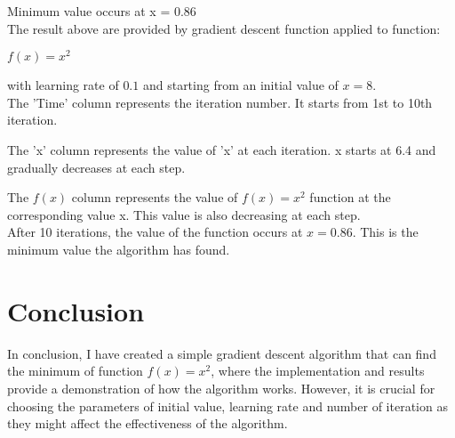 \documentclass{article}
\begin{document}
Minimum value occurs at x = 0.86\\

The result above are provided by gradient descent function applied to function:
\begin{center}
    $f(x) = x^2$
\end{center}
with learning rate of $0.1$ and starting from an initial value of $x = 8$.\\

The 'Time' column represents the iteration number. It starts from 1st to 10th iteration.

The 'x' column represents the value of 'x' at each iteration. x starts at 6.4 and gradually decreases at each step.

The $f(x)$ column represents the value of $f(x)=x^2$ function at the corresponding value x. This value is also decreasing at each step.\\

After 10 iterations, the value of the function occurs at $x = 0.86$. This is the minimum value the algorithm has found.

\section{Conclusion}

In conclusion, I have created a simple gradient descent algorithm that can find the minimum of function $f(x) = x^2$, where the implementation and results provide a demonstration of how the algorithm works. However, it is crucial for choosing the parameters of initial value, learning rate and number of iteration as they might affect the effectiveness of the algorithm.
\end{document}
